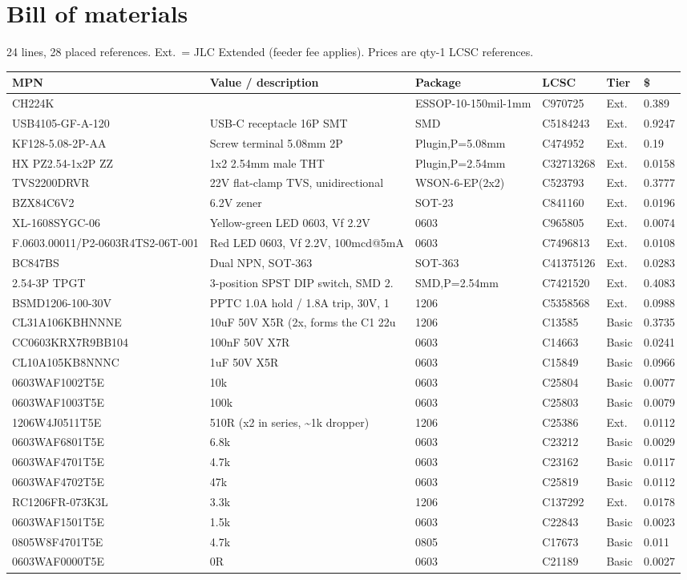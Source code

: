 \documentclass[11pt,a4paper]{article}
\begin{document}
\section{Bill of materials}
24 lines, 28 placed references. Ext.\ = JLC Extended (feeder fee applies).
Prices are qty-1 LCSC references.

{\small
\begin{longtable}{@{}p{4.2cm}p{4.2cm}p{2.6cm}lll@{}}
\toprule
MPN & Value / description & Package & LCSC & Tier & \$\\
\midrule
\endhead
CH224K &  & ESSOP-10-150mil-1mm & C970725 & Ext. & 0.389 \\
USB4105-GF-A-120 & USB-C receptacle 16P SMT & SMD & C5184243 & Ext. & 0.9247 \\
KF128-5.08-2P-AA & Screw terminal 5.08mm 2P & Plugin,P=5.08mm & C474952 & Ext. & 0.19 \\
HX PZ2.54-1x2P ZZ & 1x2 2.54mm male THT & Plugin,P=2.54mm & C32713268 & Ext. & 0.0158 \\
TVS2200DRVR & 22V flat-clamp TVS, unidirectional & WSON-6-EP(2x2) & C523793 & Ext. & 0.3777 \\
BZX84C6V2 & 6.2V zener & SOT-23 & C841160 & Ext. & 0.0196 \\
XL-1608SYGC-06 & Yellow-green LED 0603, Vf 2.2V & 0603 & C965805 & Ext. & 0.0074 \\
F.0603.00011/P2-0603R4TS2-06T-001 & Red LED 0603, Vf 2.2V, 100mcd@5mA & 0603 & C7496813 & Ext. & 0.0108 \\
BC847BS & Dual NPN, SOT-363 & SOT-363 & C41375126 & Ext. & 0.0283 \\
2.54-3P TPGT & 3-position SPST DIP switch, SMD 2. & SMD,P=2.54mm & C7421520 & Ext. & 0.4083 \\
BSMD1206-100-30V & PPTC 1.0A hold / 1.8A trip, 30V, 1 & 1206 & C5358568 & Ext. & 0.0988 \\
CL31A106KBHNNNE & 10uF 50V X5R (2x, forms the C1 22u & 1206 & C13585 & Basic & 0.3735 \\
CC0603KRX7R9BB104 & 100nF 50V X7R & 0603 & C14663 & Basic & 0.0241 \\
CL10A105KB8NNNC & 1uF 50V X5R & 0603 & C15849 & Basic & 0.0966 \\
0603WAF1002T5E & 10k & 0603 & C25804 & Basic & 0.0077 \\
0603WAF1003T5E & 100k & 0603 & C25803 & Basic & 0.0079 \\
1206W4J0511T5E & 510R (x2 in series, \textasciitilde{}1k dropper) & 1206 & C25386 & Ext. & 0.0112 \\
0603WAF6801T5E & 6.8k & 0603 & C23212 & Basic & 0.0029 \\
0603WAF4701T5E & 4.7k & 0603 & C23162 & Basic & 0.0117 \\
0603WAF4702T5E & 47k & 0603 & C25819 & Basic & 0.0112 \\
RC1206FR-073K3L & 3.3k & 1206 & C137292 & Ext. & 0.0178 \\
0603WAF1501T5E & 1.5k & 0603 & C22843 & Basic & 0.0023 \\
0805W8F4701T5E & 4.7k & 0805 & C17673 & Basic & 0.011 \\
0603WAF0000T5E & 0R & 0603 & C21189 & Basic & 0.0027 \\
\bottomrule
\end{longtable}
}
\end{document}
